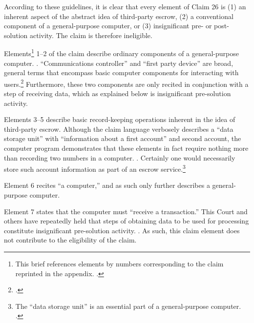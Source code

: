 \documentclass{scotus}
\begin{document}
According to these guidelines, it is clear
that every element of Claim 26 is (1) an inherent aspect of the
abstract idea of third-party escrow, (2) a conventional component of a
general-purpose computer, or
(3) insignificant pre- or post-solution activity.
The claim is therefore
ineligible.


Elements\footnote{This brief references elements by numbers corresponding to
the claim reprinted in the appendix. .} 1--2 of
the
claim describe ordinary components of a general-purpose computer. . ``Communications controller'' and
``first party device'' are broad, general terms that encompass basic computer
components for interacting with users.\footnote{.} Furthermore,
these two components are only recited in conjunction with a step of receiving
data, which as explained below is insignificant pre-solution activity.

Elements 3--5 describe basic record-keeping operations inherent in the idea of
third-party escrow. Although the claim language verbosely describes a ``data
storage unit'' with ``information about a first account'' and second account,
the computer program demonstrates that these elements in fact
require nothing more than recording two
numbers in a computer. .
Certainly one would necessarily store such account information as part of an
escrow service.\footnote{The ``data storage unit'' is an essential part of a
general-purpose computer. .}

Element 6 recites ``a computer,'' and as such only further describes a
general-purpose computer.

Element 7 states that the computer must ``receive a transaction.'' This Court
and others have repeatedly held that steps of
obtaining data to be used for processing
constitute insignificant pre-solution activity. . As such,
this
claim element does not contribute to the eligibility of the claim.
\end{document}
